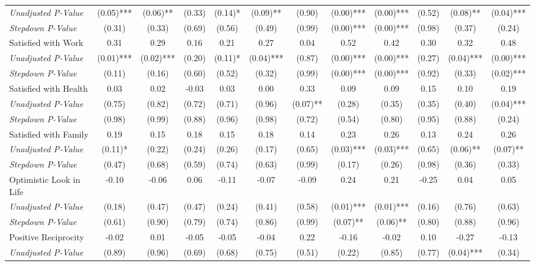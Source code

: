 \begin{tabular}{l c c c c c c c c c c c}
\quad \textit{Unadjusted P-Value} & (0.05)*** & (0.06)** & (0.33) & (0.14)* & (0.09)** & (0.90) & (0.00)*** & (0.00)*** & (0.52) & (0.08)** & (0.04)*** \\
\quad \textit{Stepdown P-Value} & (0.31) & (0.33) & (0.69) & (0.56) & (0.49) & (0.99) & (0.00)*** & (0.00)*** & (0.98) & (0.37) & (0.24) \\
Satisfied with Work & 0.31 & 0.29 & 0.16 & 0.21 & 0.27 & 0.04 & 0.52 & 0.42 & 0.30 & 0.32 & 0.48 \\
\quad \textit{Unadjusted P-Value} & (0.01)*** & (0.02)*** & (0.20) & (0.11)* & (0.04)*** & (0.87) & (0.00)*** & (0.00)*** & (0.27) & (0.04)*** & (0.00)*** \\
\quad \textit{Stepdown P-Value} & (0.11) & (0.16) & (0.60) & (0.52) & (0.32) & (0.99) & (0.00)*** & (0.00)*** & (0.92) & (0.33) & (0.02)*** \\
Satisfied with Health & 0.03 & 0.02 & -0.03 & 0.03 & 0.00 & 0.33 & 0.09 & 0.09 & 0.15 & 0.10 & 0.19 \\
\quad \textit{Unadjusted P-Value} & (0.75) & (0.82) & (0.72) & (0.71) & (0.96) & (0.07)** & (0.28) & (0.35) & (0.35) & (0.40) & (0.04)*** \\
\quad \textit{Stepdown P-Value} & (0.98) & (0.99) & (0.88) & (0.96) & (0.98) & (0.72) & (0.54) & (0.80) & (0.95) & (0.88) & (0.24) \\
Satisfied with Family & 0.19 & 0.15 & 0.18 & 0.15 & 0.18 & 0.14 & 0.23 & 0.26 & 0.13 & 0.24 & 0.26 \\
\quad \textit{Unadjusted P-Value} & (0.11)* & (0.22) & (0.24) & (0.26) & (0.17) & (0.65) & (0.03)*** & (0.03)*** & (0.65) & (0.06)** & (0.07)** \\
\quad \textit{Stepdown P-Value} & (0.47) & (0.68) & (0.59) & (0.74) & (0.63) & (0.99) & (0.17) & (0.26) & (0.98) & (0.36) & (0.33) \\
Optimistic Look in Life & -0.10 & -0.06 & 0.06 & -0.11 & -0.07 & -0.09 & 0.24 & 0.21 & -0.25 & 0.04 & 0.05 \\
\quad \textit{Unadjusted P-Value} & (0.18) & (0.47) & (0.47) & (0.24) & (0.41) & (0.58) & (0.01)*** & (0.01)*** & (0.16) & (0.76) & (0.63) \\
\quad \textit{Stepdown P-Value} & (0.61) & (0.90) & (0.79) & (0.74) & (0.86) & (0.99) & (0.07)** & (0.06)** & (0.80) & (0.88) & (0.96) \\
Positive Reciprocity & -0.02 & 0.01 & -0.05 & -0.05 & -0.04 & 0.22 & -0.16 & -0.02 & 0.10 & -0.27 & -0.13 \\
\quad \textit{Unadjusted P-Value} & (0.89) & (0.96) & (0.69) & (0.68) & (0.75) & (0.51) & (0.22) & (0.85) & (0.77) & (0.04)*** & (0.34) \\

\end{tabular}
